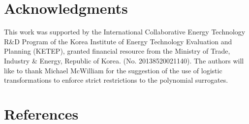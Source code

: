 \documentclass[preprint,12pt]{elsarticle}
\begin{document}

\section{Acknowledgments}

This work was supported by the International Collaborative Energy Technology R\&D Program of the Korea Institute of Energy Technology Evaluation and Planning (KETEP), granted financial resource from the Ministry of Trade, Industry \& Energy, Republic of Korea. (No. 20138520021140). The authors will like to thank Michael McWilliam for the suggestion of the use of logistic transformations to enforce strict restrictions to the polynomial surrogates.




\section*{References}
\small




\end{document}
